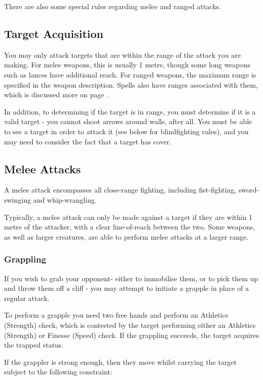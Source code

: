 There are also some special rules regarding melee and ranged attacks.
\subsection{Target Acquisition}

You may only attack targets that are within the range of the attack you are making. For melee weapons, this is usually 1 metre, though some long weapons such as lances have additional reach. For ranged weapons, the maximum range is specified in the weapon description. Spells also have ranges associated with them, which is discussed more on page \pageref{S:Range}. 

In addition, to determining if the target is in range, you must determine if it is a valid target - you cannot shoot arrows around walls, after all. You must be able to see a target in order to attack it (see below for blindfighting rules), and you may need to consider the fact that a target has cover. 


\subsection{Melee Attacks}

A melee attack encompasses all close-range fighting, including fist-fighting, sword-swinging and whip-wrangling.

Typically, a melee attack can only be made against a target if they are within 1 metre of the attacker, with a clear line-of-reach between the two. Some weapons, as well as larger creatures, are able to perform melee attacks at a larger range.  

\subsubsection{Grappling}

If you wish to grab your opponent- either to immobilise them, or to pick them up and throw them off a cliff - you may attempt to initiate a grapple in place of a regular attack. 

To perform a grapple you need two free hands and perform an Athletics (Strength) check, which is contested by the target performing either an Athletics (Strength) or Finesse (Speed) check. If the grappling succeeds, the target acquires the trapped status. 

If the grappler is strong enough, then they move whilst carrying the target subject to the following constraint:

